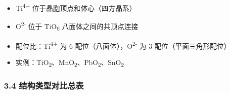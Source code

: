\documentclass[a4paper,11pt]{ctexart}
\providecommand{\tightlist}{\setlength{\itemsep}{0pt}\setlength{\parskip}{0pt}}
\begin{document}
\begin{itemize}
\tightlist
\item
  Ti\textsuperscript{4+} 位于晶胞顶点和体心（四方晶系）
\item
  O\textsuperscript{2-} 位于 TiO\textsubscript{6} 八面体之间的共顶点连接
\item
  配位比：Ti\textsuperscript{4+} 为 6 配位（八面体），O\textsuperscript{2-} 为 3 配位（平面三角形配位）
\item
  实例：TiO\textsubscript{2}、MnO\textsubscript{2}、PbO\textsubscript{2}、SnO\textsubscript{2}
\end{itemize}

\subsubsection{3.4 结构类型对比总表}\label{ux7ed3ux6784ux7c7bux578bux5bf9ux6bd4ux603bux8868}
\end{document}

